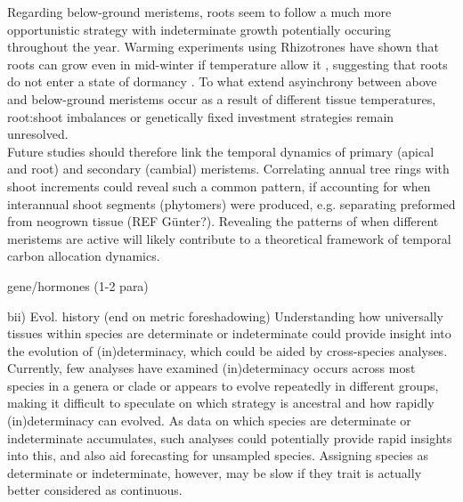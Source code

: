 \documentclass{article}
\begin{document}
Regarding below-ground meristems, roots seem to follow a much more opportunistic strategy with indeterminate growth potentially occuring throughout the year. Warming experiments using Rhizotrones have shown that roots can grow even in mid-winter if temperature allow it \cite{lyfordControlledGrowthForest1966}, suggesting that roots do not enter a state of dormancy \cite{radvilleRootPhenologyChanging2016}. To what extend asyinchrony between above and below-ground meristems occur as a result of different tissue temperatures, root:shoot imbalances or genetically fixed investment strategies remain unresolved\cite{abramoffAreBelowgroundPhenology2015, makotoSynchronousAsynchronousRoot2020}.\\

 Future studies should therefore link the temporal dynamics of primary (apical and root) and secondary (cambial) meristems. Correlating annual tree rings with shoot increments could reveal such a common pattern, if accounting for when interannual shoot segments (phytomers) were produced, e.g. separating preformed from neogrown tissue (REF Günter?). Revealing the patterns of when different meristems are active will likely contribute to a theoretical framework of temporal carbon allocation dynamics.

	

	gene/hormones (1-2 para) %
	
	bii) Evol. history (end on metric foreshadowing) %
	Understanding how universally tissues within species are determinate or indeterminate could provide insight into the evolution of (in)determinacy, which could be aided by cross-species analyses. Currently, few analyses have examined (in)determinacy occurs across most species in a genera or clade or appears to evolve repeatedly in different groups, making it difficult to speculate on which strategy is ancestral and how rapidly (in)determinacy can evolved. As data on which species are determinate or indeterminate accumulates, such analyses could potentially provide rapid insights into this, and also aid forecasting for unsampled species. Assigning species as determinate or indeterminate, however, may be slow if they trait is actually better considered as continuous. %
	
\end{document}
